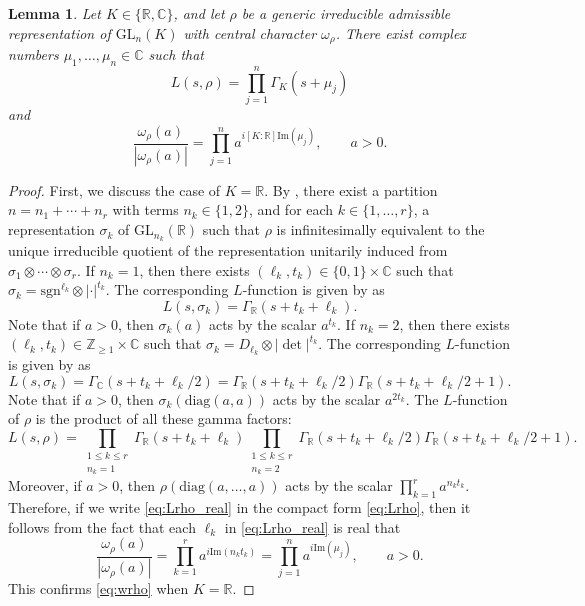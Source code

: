 \documentclass[12pt]{amsart}
\newtheorem{lemma}[theorem]{Lemma}
\theoremstyle{definition}
\theoremstyle{remark}
\numberwithin{equation}{section}
\theoremstyle{plain}
\renewcommand{\Im}{\mathrm{Im}}
\newcommand{\GL}{\mathrm{GL}}
\newcommand{\diag}{\mathrm{diag}}
\newcommand{\sgn}{\mathrm{sgn}}
\newcommand{\Z}{\mathbb{Z}}
\newcommand{\R}{\mathbb{R}}
\newcommand{\CC}{\mathbb{C}}
\begin{document}
\begin{lemma}\label{lem:rhochar}
Let $K\in\{\R,\CC\}$, and let $\rho$ be a generic irreducible admissible representation of $\GL_n(K)$ with central character $\omega_\rho$. There exist complex numbers $\mu_1,\dotsc,\mu_n\in\CC$ such that
\begin{equation}\label{eq:Lrho}
L(s,\rho)=\prod_{j=1}^n\Gamma_K(s+\mu_j)
\end{equation}
and
\begin{equation}\label{eq:wrho}
\frac{\omega_\rho(a)}{|\omega_\rho(a)|}=\prod_{j=1}^n a^{i[K:\R]\Im(\mu_j)},\qquad a>0.
\end{equation}
\end{lemma}

\begin{proof}
First, we discuss the case of $K=\R$. By \cite[Theorem~1]{Knapp}, there exist a partition $n=n_1+\cdots+n_r$ with terms $n_k\in\{1,2\}$, and for each $k\in\{1,\dotsc,r\}$, a representation $\sigma_k$ of $\GL_{n_k}(\R)$ such that $\rho$ is infinitesimally equivalent to the unique irreducible quotient of the representation unitarily induced from $\sigma_1\otimes\cdots\otimes\sigma_r$. If $n_k=1$, then there exists $(\ell_k,t_k)\in\{0,1\}\times\CC$ such that $\sigma_k=\sgn^{\ell_k}\otimes|\cdot|^{t_k}$. The corresponding $L$-function is given by \cite[(3.4)~\&~(3.6)]{Knapp} as \[L(s,\sigma_k)=\Gamma_\R(s+t_k+\ell_k).\]
Note that if $a>0$, then $\sigma_k(a)$ acts by the scalar $a^{t_k}$. If $n_k=2$, then there exists $(\ell_k,t_k)\in\Z_{\geq 1}\times\CC$ such that $\sigma_k=D_{\ell_k}\otimes|\det|^{t_k}$. The corresponding $L$-function is given by \cite[(3.4)~\&~(3.6)]{Knapp} as
\[L(s,\sigma_k)=\Gamma_\CC(s+t_k+\ell_k/2)=\Gamma_\R(s+t_k+\ell_k/2)\Gamma_\R(s+t_k+\ell_k/2+1).\]
Note that if $a>0$, then $\sigma_k(\diag(a,a))$ acts by the scalar $a^{2t_k}$. The $L$-function of $\rho$ is the product of all these gamma factors:
\begin{equation}\label{eq:Lrho_real}
L(s,\rho)=\prod_{\substack{1\leq k\leq r\\n_k=1}}\Gamma_\R(s+t_k+\ell_k)
\prod_{\substack{1\leq k\leq r\\n_k=2}}\Gamma_\R(s+t_k+\ell_k/2)\Gamma_\R(s+t_k+\ell_k/2+1).
\end{equation}
Moreover, if $a>0$, then $\rho(\diag(a,\dotsc,a))$ acts by the scalar $\prod_{k=1}^r a^{n_k t_k}$. Therefore, if we write \eqref{eq:Lrho_real} in the compact form \eqref{eq:Lrho}, then it follows from the fact that each $\ell_k$ in \eqref{eq:Lrho_real} is real that
\[\frac{\omega_\rho(a)}{|\omega_\rho(a)|}=\prod_{k=1}^r a^{i\Im(n_kt_k)}=\prod_{j=1}^n a^{i\Im(\mu_j)},\qquad a>0.\]
This confirms \eqref{eq:wrho} when $K=\R$.


\end{proof}
\end{document}
